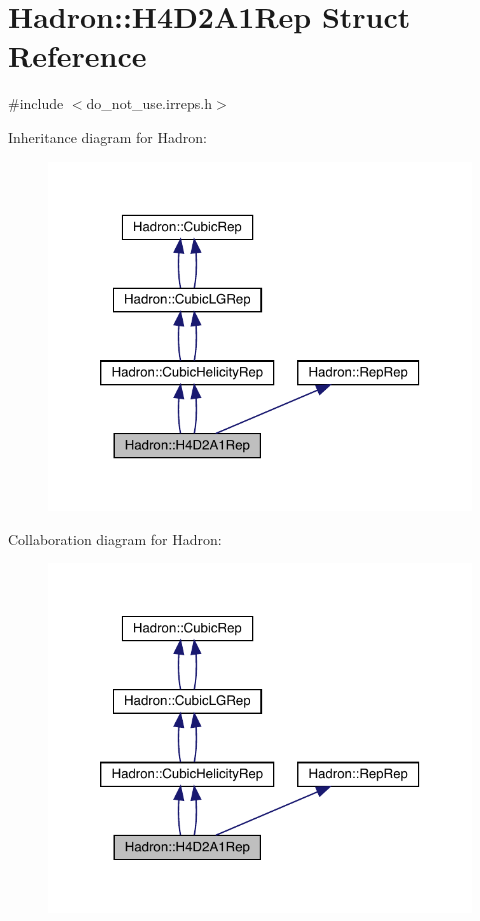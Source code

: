 \hypertarget{structHadron_1_1H4D2A1Rep}{}\section{Hadron\+:\+:H4\+D2\+A1\+Rep Struct Reference}
\label{structHadron_1_1H4D2A1Rep}


{\ttfamily \#include $<$do\+\_\+not\+\_\+use.\+irreps.\+h$>$}



Inheritance diagram for Hadron\+:\nopagebreak
\begin{figure}[H]
\begin{center}
\leavevmode
\includegraphics[width=320pt]{d8/d77/structHadron_1_1H4D2A1Rep__inherit__graph}
\end{center}
\end{figure}


Collaboration diagram for Hadron\+:\nopagebreak
\begin{figure}[H]
\begin{center}
\leavevmode
\includegraphics[width=320pt]{d6/d1b/structHadron_1_1H4D2A1Rep__coll__graph}
\end{center}
\end{figure}
